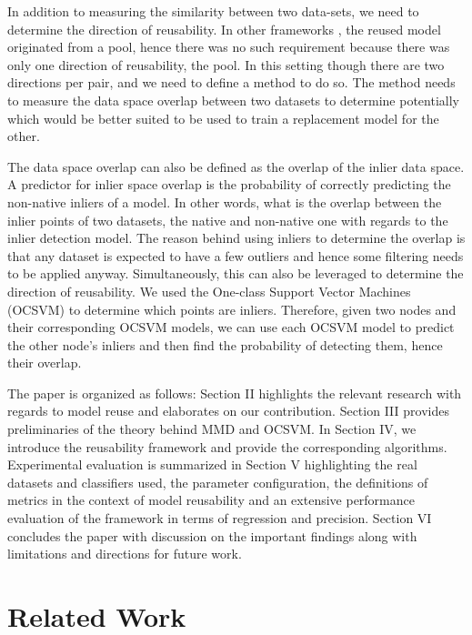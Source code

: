 \documentclass{mpaper}
\begin{document}
In addition to measuring the similarity between two data-sets, we need to determine the direction of reusability. In other frameworks \cite{MaterializationReuse,KernelMMD}, the reused model originated from a pool, hence there was no such requirement because there was only one direction of reusability, the pool. In this setting though there are two directions per pair, and we need to define a method to do so. The method needs to measure the data space overlap between two datasets to determine potentially which would be better suited to be used to train a replacement model for the other. 

The data space overlap can also be defined as the overlap of the inlier data space. A predictor for inlier space overlap is the probability of correctly predicting the non-native inliers of a model. In other words, what is the overlap between the inlier points of two datasets, the native and non-native one with regards to the inlier detection model. The reason behind using inliers to determine the overlap is that any dataset is expected to have a few outliers and hence some filtering needs to be applied anyway. Simultaneously, this can also be leveraged to determine the direction of reusability. We used the One-class Support Vector Machines (OCSVM) \cite{OriginalOCSVM} to determine which points are inliers. Therefore, given two nodes and their corresponding OCSVM models, we can use each OCSVM model to predict the other node's inliers and then find the probability of detecting them, hence their overlap. 

The paper is organized as follows: Section II highlights the relevant research with regards to model reuse and elaborates on our contribution. Section III provides preliminaries of the theory behind MMD and OCSVM. In Section IV, we introduce the reusability framework and provide the corresponding algorithms. Experimental evaluation is summarized in Section V highlighting the real datasets and classifiers used, the parameter configuration, the definitions of metrics in the context of model reusability and an extensive performance evaluation of the framework in terms of regression and precision. Section VI concludes the paper with discussion on the important findings along with limitations and directions for future work.

\section{Related Work}
\end{document}
